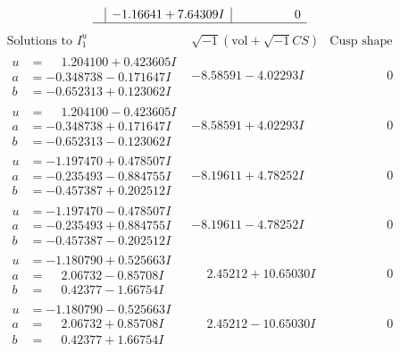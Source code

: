 \documentclass[1p]{elsarticle_modified}
\theoremstyle{definition}
\newcommand{\I}{\sqrt{-1}}
\begin{document}
$$\begin{array}{c|c|c}
 & -1.16641 + 7.64309 I & \phantom{-0.000000 } 0\\
 \hline 
 \end{array}$$\newpage$$\begin{array}{c|c|c}  
\text{Solutions to }I^u_{1}& \I (\text{vol} + \sqrt{-1}CS) & \text{Cusp shape}\\
 \hline 
\begin{aligned}
u &= \phantom{-}1.204100 + 0.423605 I \\
a &= -0.348738 - 0.171647 I \\
b &= -0.652313 + 0.123062 I\end{aligned}
 & -8.58591 - 4.02293 I & \phantom{-0.000000 } 0 \\ \hline\begin{aligned}
u &= \phantom{-}1.204100 - 0.423605 I \\
a &= -0.348738 + 0.171647 I \\
b &= -0.652313 - 0.123062 I\end{aligned}
 & -8.58591 + 4.02293 I & \phantom{-0.000000 } 0 \\ \hline\begin{aligned}
u &= -1.197470 + 0.478507 I \\
a &= -0.235493 - 0.884755 I \\
b &= -0.457387 + 0.202512 I\end{aligned}
 & -8.19611 + 4.78252 I & \phantom{-0.000000 } 0 \\ \hline\begin{aligned}
u &= -1.197470 - 0.478507 I \\
a &= -0.235493 + 0.884755 I \\
b &= -0.457387 - 0.202512 I\end{aligned}
 & -8.19611 - 4.78252 I & \phantom{-0.000000 } 0 \\ \hline\begin{aligned}
u &= -1.180790 + 0.525663 I \\
a &= \phantom{-}2.06732 - 0.85708 I \\
b &= \phantom{-}0.42377 - 1.66754 I\end{aligned}
 & \phantom{-}2.45212 + 10.65030 I & \phantom{-0.000000 } 0 \\ \hline\begin{aligned}
u &= -1.180790 - 0.525663 I \\
a &= \phantom{-}2.06732 + 0.85708 I \\
b &= \phantom{-}0.42377 + 1.66754 I\end{aligned}
 & \phantom{-}2.45212 - 10.65030 I & \phantom{-0.000000 } 0 \\ \hline\begin{aligned}

\end{aligned}
\end{array}$$
\end{document}
